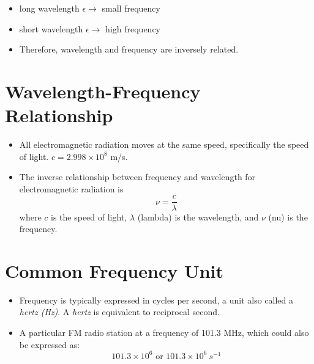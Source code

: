 \documentclass[
	chapter=7,
	title={Quantum Theory {\&} the Electronic Structure of Atoms},
	showanswers=true,
]{chem122notes}
\begin{document}
\begin{itemize}
	\item long wavelength $\epsilon \rightarrow$ small frequency
	\item short wavelength $\epsilon \rightarrow$ high frequency
	\item Therefore, wavelength and frequency are inversely related.
\end{itemize}

\section{Wavelength-Frequency Relationship}\label{sec:wavelength-frequency-relationship}
\begin{itemize}
	\item All electromagnetic radiation moves at the same speed, specifically the speed of light. $c = 2.998 \times 10^{8}$ m/s.
	\item The inverse relationship between frequency and wavelength for electromagnetic radiation is
	\begin{equation}
		\nu = \frac{c}{\lambda}
		\label{eq:wavelength-frequency-relationship}
	\end{equation}
	where $c$ is the speed of light, $\lambda$ (lambda) is the wavelength, and $\nu$ (nu) is the frequency.
\end{itemize}


\section{Common Frequency Unit}\label{sec:common-frequency-unit}
\begin{itemize}
	\item Frequency is typically expressed in cycles per second, a unit also called a \emph{hertz (Hz)}. A \emph{hertz} is equivalent to reciprocal second.
	\item A particular FM radio station at a frequency of 101.3 MHz, which could also be expressed as:
	\[ 101.3 \times 10^{6} \mbox{ or } 101.3 \times 10^{6}\ s^{-1} \]
\end{itemize}
\end{document}
